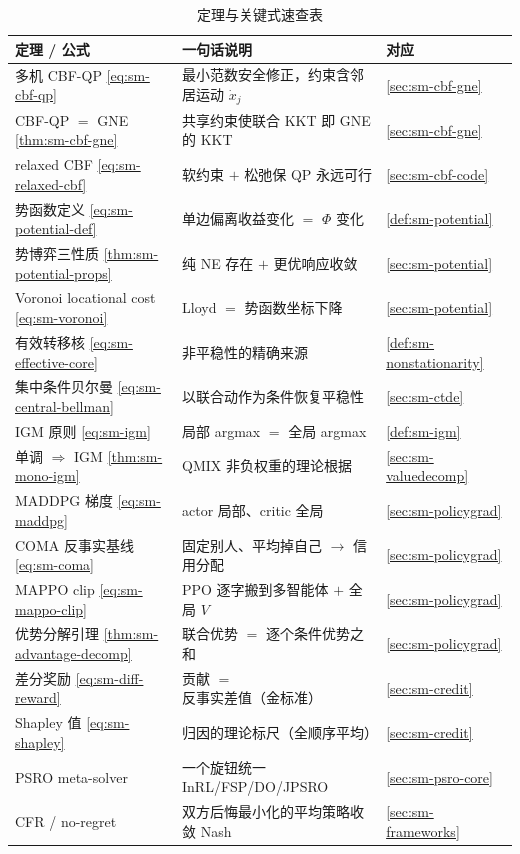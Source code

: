 \begin{table}[H]\centering\small
\caption{定理与关键式速查表}
\begin{tabular}{lll}
\toprule
定理 / 公式 & 一句话说明 & 对应 \\
\midrule
多机 CBF-QP \cref{eq:sm-cbf-qp} & 最小范数安全修正，约束含邻居运动 $\dot x_j$ & \cref{sec:sm-cbf-gne} \\
CBF-QP $=$ GNE \cref{thm:sm-cbf-gne} & 共享约束使联合 KKT 即 GNE 的 KKT & \cref{sec:sm-cbf-gne} \\
relaxed CBF \cref{eq:sm-relaxed-cbf} & 软约束 $+$ 松弛保 QP 永远可行 & \cref{sec:sm-cbf-code} \\
势函数定义 \cref{eq:sm-potential-def} & 单边偏离收益变化 $=$ $\Phi$ 变化 & \cref{def:sm-potential} \\
势博弈三性质 \cref{thm:sm-potential-props} & 纯 NE 存在 $+$ 更优响应收敛 & \cref{sec:sm-potential} \\
Voronoi locational cost \cref{eq:sm-voronoi} & Lloyd $=$ 势函数坐标下降 & \cref{sec:sm-potential} \\
有效转移核 \cref{eq:sm-effective-core} & 非平稳性的精确来源 & \cref{def:sm-nonstationarity} \\
集中条件贝尔曼 \cref{eq:sm-central-bellman} & 以联合动作为条件恢复平稳性 & \cref{sec:sm-ctde} \\
IGM 原则 \cref{eq:sm-igm} & 局部 argmax $=$ 全局 argmax & \cref{def:sm-igm} \\
单调 $\Rightarrow$ IGM \cref{thm:sm-mono-igm} & QMIX 非负权重的理论根据 & \cref{sec:sm-valuedecomp} \\
MADDPG 梯度 \cref{eq:sm-maddpg} & actor 局部、critic 全局 & \cref{sec:sm-policygrad} \\
COMA 反事实基线 \cref{eq:sm-coma} & 固定别人、平均掉自己 $\to$ 信用分配 & \cref{sec:sm-policygrad} \\
MAPPO clip \cref{eq:sm-mappo-clip} & PPO 逐字搬到多智能体 $+$ 全局 $V$ & \cref{sec:sm-policygrad} \\
优势分解引理 \cref{thm:sm-advantage-decomp} & 联合优势 $=$ 逐个条件优势之和 & \cref{sec:sm-policygrad} \\
差分奖励 \cref{eq:sm-diff-reward} & 贡献 $=$ 反事实差值（金标准） & \cref{sec:sm-credit} \\
Shapley 值 \cref{eq:sm-shapley} & 归因的理论标尺（全顺序平均） & \cref{sec:sm-credit} \\
PSRO meta-solver & 一个旋钮统一 InRL/FSP/DO/JPSRO & \cref{sec:sm-psro-core} \\
CFR / no-regret & 双方后悔最小化的平均策略收敛 Nash & \cref{sec:sm-frameworks} \\
\bottomrule
\end{tabular}
\end{table}

